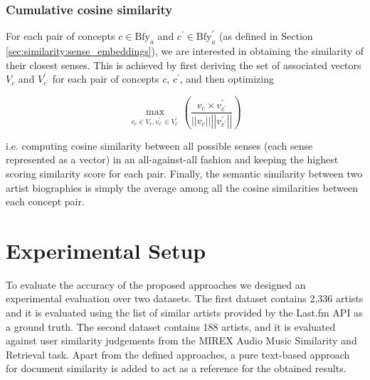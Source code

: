 \subsubsection{Cumulative cosine similarity} %

For each pair of concepts $c \in \text{Bfy}_{a}$ and $c^{\prime} \in \text{Bfy}^{\prime}_{a}$ (as defined in Section \ref{sec:similarity:sense_embeddings}), we are interested in obtaining the similarity of their closest senses. This is achieved by first deriving the set of associated vectors $V_c$ and $V_{c^{\prime}}^{\prime}$ for each pair of concepts $c,\,c^{\prime}$, and then optimizing

\begin{equation}
\operatorname{max}_{v_c \in V_c , v_{c^{\prime}}^{\prime} \in V_{c^{\prime}}^{\prime}}
\left( \frac{v_c \times v_{c^{\prime}}^{\prime}}{\left\vert\left\vert{v_c}\right\vert\right\vert \left\vert\left\vert{v_{c^{\prime}}^{\prime}}\right\vert\right\vert } \right)
\end{equation}

i.e. computing cosine similarity between all possible senses (each sense represented as a vector) in an all-against-all fashion and keeping the highest scoring similarity score for each pair. Finally, the semantic similarity between two artist biographies is simply the average among all the cosine similarities between each concept pair.

\section{Experimental Setup}
\label{sec:similarity:experimentalsetup}

To evaluate the accuracy of the proposed approaches we designed an experimental evaluation over two datasets. The first dataset contains 2,336 artists and it is evaluated using the list of similar artists provided by the Last.fm API as a ground truth. The second dataset contains 188 artists, and it is evaluated against user similarity judgements from the MIREX Audio Music Similarity and Retrieval task.
Apart from the defined approaches, a pure text-based approach for document similarity is added to act as a reference for the obtained results.

